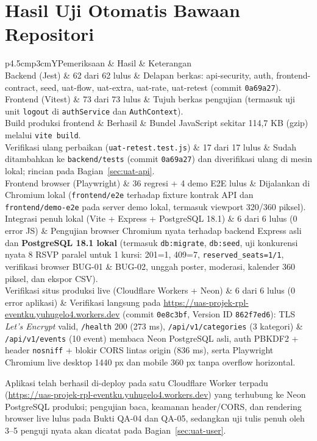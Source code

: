 \documentclass[11pt,a4paper]{article}
\newcommand{\tbl}[2]{\par\smallskip\noindent\begin{tabularx}{\linewidth}{#1}\toprule #2\bottomrule\end{tabularx}\par\smallskip}
\begin{document}
\section{Hasil Uji Otomatis Bawaan Repositori}\label{sec:uat-base}
\tbl{p{4.5cm}p{3cm}Y}{Pemeriksaan & Hasil & Keterangan\\\midrule
Backend (Jest) & 62 dari 62 lulus & Delapan berkas: api-security, auth, frontend-contract, seed, uat-flow, uat-extra, uat-rate, uat-retest (commit \texttt{0a69a27}).\\
Frontend (Vitest) & 73 dari 73 lulus & Tujuh berkas pengujian (termasuk uji unit \texttt{logout} di \texttt{authService} dan \texttt{AuthContext}).\\
Build produksi frontend & Berhasil & Bundel JavaScript sekitar 114,7 KB (gzip) melalui \texttt{vite build}.\\
Verifikasi ulang perbaikan (\texttt{uat-retest.test.js}) & 17 dari 17 lulus & Sudah ditambahkan ke \texttt{backend/tests} (commit \texttt{0a69a27}) dan diverifikasi ulang di mesin lokal; rincian pada Bagian~\ref{sec:uat-api}.\\
Frontend browser (Playwright) & 36 regresi + 4 demo E2E lulus & Dijalankan di Chromium lokal (\texttt{frontend/e2e} terhadap fixture kontrak API dan \texttt{frontend/demo-e2e} pada server demo lokal, termasuk viewport 320/360 piksel).\\
Integrasi penuh lokal (Vite + Express + PostgreSQL 18.1) & 6 dari 6 lulus (0 error JS) & Pengujian browser Chromium nyata terhadap backend Express asli dan \textbf{PostgreSQL 18.1 lokal} (termasuk \texttt{db:migrate}, \texttt{db:seed}, uji konkurensi nyata 8 RSVP paralel untuk 1 kursi: 201=1, 409=7, \texttt{reserved\_seats=1/1}, verifikasi browser BUG-01 \& BUG-02, unggah poster, moderasi, kalender 360 piksel, dan ekspor CSV).\\
Verifikasi situs produksi live (Cloudflare Workers + Neon) & 6 dari 6 lulus (0 error aplikasi) & Verifikasi langsung pada \url{https://uas-projek-rpl-eventku.yuhugelo4.workers.dev} (commit \texttt{0e8c3bf}, Version ID \texttt{862f7ed6}): TLS \emph{Let's Encrypt} valid, \texttt{/health} 200 (273 ms), \texttt{/api/v1/categories} (3 kategori) \& \texttt{/api/v1/events} (10 event) membaca Neon PostgreSQL asli, auth PBKDF2 + header \texttt{nosniff} + blokir CORS lintas origin (836 ms), serta Playwright Chromium live desktop 1440 px dan mobile 360 px tanpa overflow horizontal.\\}
Aplikasi telah berhasil di-deploy pada satu Cloudflare Worker terpadu (\url{https://uas-projek-rpl-eventku.yuhugelo4.workers.dev}) yang terhubung ke Neon PostgreSQL produksi; pengujian baca, keamanan header/CORS, dan rendering browser live lulus pada Bukti QA-04 dan QA-05, sedangkan uji tulis penuh oleh 3--5 penguji nyata akan dicatat pada Bagian~\ref{sec:uat-user}.
\end{document}
